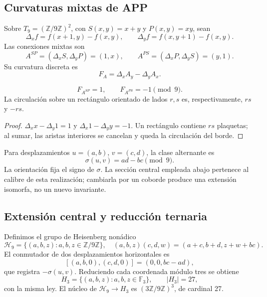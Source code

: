 \subsection{Curvaturas mixtas de APP}

Sobre \(T_9=(\mathbb Z/9\mathbb Z)^2\), con
\(S(x,y)=x+y\) y \(P(x,y)=xy\), sean
\[
 \Delta_xf=f(x+1,y)-f(x,y),\qquad
 \Delta_yf=f(x,y+1)-f(x,y).
\]
Las conexiones mixtas son
\[
 A^{SP}=(\Delta_xS,\Delta_yP)=(1,x),\qquad
 A^{PS}=(\Delta_xP,\Delta_yS)=(y,1).
\]
Su curvatura discreta es
\[
 F_A=\Delta_xA_y-\Delta_yA_x.
\]

\begin{proposition}
\label{p12-83-c20-s6:prop:curvaturas-app-e6-nuevo}
\[
 F_{A^{SP}}=1,\qquad F_{A^{PS}}=-1\pmod9.
\]
La circulación sobre un rectángulo orientado de lados \(r,s\) es,
respectivamente, \(rs\) y \(-rs\).
\end{proposition}

\begin{proof}
\(\Delta_xx-\Delta_y1=1\) y
\(\Delta_x1-\Delta_yy=-1\). Un rectángulo contiene \(rs\) plaquetas; al
sumar, las aristas interiores se cancelan y queda la circulación del borde.
\end{proof}

Para desplazamientos \(u=(a,b)\), \(v=(c,d)\), la clase alternante es
\begin{equation}
 \sigma(u,v)=ad-bc\pmod9.
 \label{p12-83-c20-s6:eq:forma-alternante-e6-nueva}
\end{equation}
La orientación fija el signo de \(\sigma\). La sección central empleada
abajo pertenece al calibre de esta realización; cambiarla por un coborde
produce una extensión isomorfa, no un nuevo invariante.

\subsection{Extensión central y reducción ternaria}

Definimos el grupo de Heisenberg nonádico
\begin{equation}
 \mathcal H_9=\{(a,b,z):a,b,z\in\mathbb Z/9\mathbb Z\},
 \quad
 (a,b,z)(c,d,w)=(a+c,b+d,z+w+bc).
 \label{p12-83-c20-s6:eq:heisenberg-9-nuevo}
\end{equation}
El conmutador de dos desplazamientos horizontales es
\[
 [(a,b,0),(c,d,0)]=(0,0,bc-ad),
\]
que registra \(-\sigma(u,v)\). Reduciendo cada coordenada módulo tres se
obtiene
\begin{equation}
 H_3=\{(a,b,z):a,b,z\in\mathbb F_3\},\qquad |H_3|=27,
 \label{p12-83-c20-s6:eq:heisenberg-3-nuevo}
\end{equation}
con la misma ley. El núcleo de
\(\mathcal H_9\to H_3\) es
\((3\mathbb Z/9\mathbb Z)^3\), de cardinal 27.

